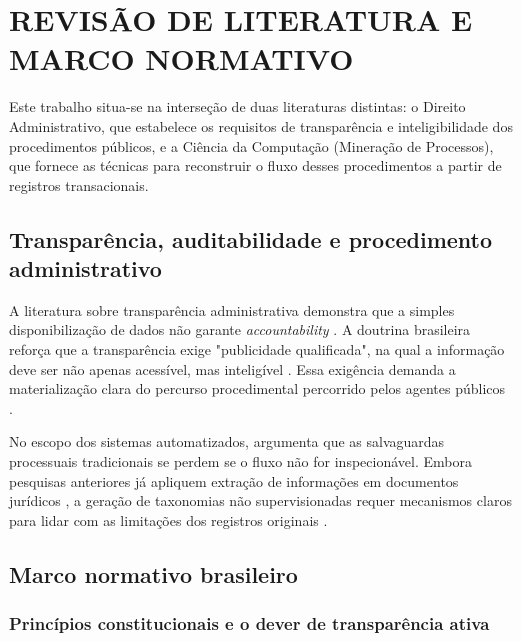 \section{REVISÃO DE LITERATURA E MARCO NORMATIVO}
\label{sec:revisao}

Este trabalho situa-se na interseção de duas literaturas distintas: o Direito Administrativo, que estabelece os requisitos de transparência e inteligibilidade dos procedimentos públicos, e a Ciência da Computação (Mineração de Processos), que fornece as técnicas para reconstruir o fluxo desses procedimentos a partir de registros transacionais. 

\subsection{Transparência, auditabilidade e procedimento administrativo}
\label{sec:rev-transparencia}

A literatura sobre transparência administrativa demonstra que a simples disponibilização de dados não garante \emph{accountability} \cite{ananny2018seeing, janssen2012benefits}. A doutrina brasileira reforça que a transparência exige "publicidade qualificada", na qual a informação deve ser não apenas acessível, mas inteligível \cite[p.~245]{brbaptista2023transparencia}. Essa exigência demanda a materialização clara do percurso procedimental percorrido pelos agentes públicos \cite[p.~255--256]{brbaptista2023transparencia}.

No escopo dos sistemas automatizados,  argumenta que as salvaguardas processuais tradicionais se perdem se o fluxo não for inspecionável. Embora pesquisas anteriores já apliquem extração de informações em documentos jurídicos \cite{branting2025sensitive, tinarrage2025empirical, vianna2024topic}, a geração de taxonomias não supervisionadas requer mecanismos claros para lidar com as limitações dos registros originais \cite{medvedeva2023rethinking, nickerson2013taxonomy}.

\subsection{Marco normativo brasileiro}
\label{sec:rev-normativo}

\subsubsection{Princípios constitucionais e o dever de transparência ativa}

